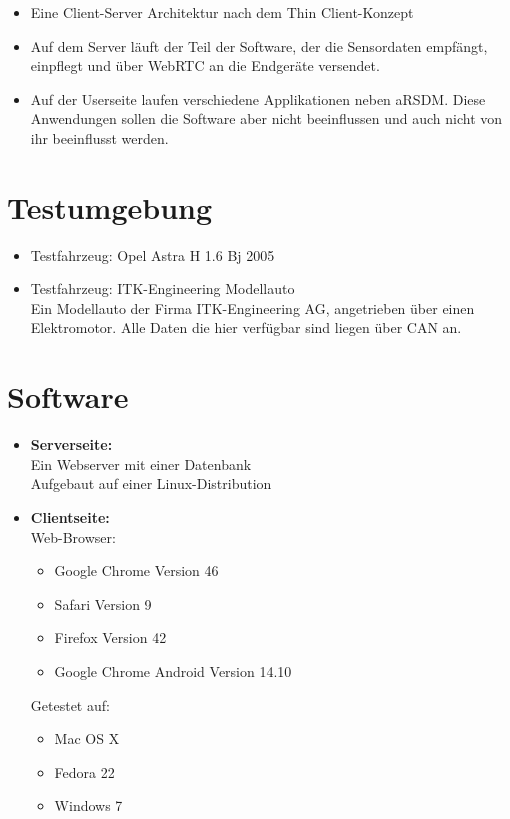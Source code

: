 \documentclass[pflichtenheft.tex]{subfiles}
\begin{document}
\begin{itemize}

\item
Eine Client-Server Architektur nach dem Thin Client-Konzept
\item
Auf dem Server läuft der Teil der Software, der die Sensordaten empfängt, einpflegt und über WebRTC an die Endgeräte versendet.
\item
Auf der Userseite laufen verschiedene Applikationen neben aRSDM. Diese Anwendungen sollen die Software aber nicht beeinflussen und auch nicht von ihr beeinflusst werden.
\end{itemize}

\section*{Testumgebung}
\begin{itemize}
\item
Testfahrzeug: Opel Astra H 1.6 Bj 2005 %
\item
Testfahrzeug: ITK-Engineering Modellauto \\
Ein Modellauto der Firma ITK-Engineering AG, angetrieben über einen Elektromotor. Alle Daten die hier verfügbar sind liegen über CAN an.
\end{itemize}


\section{Software}
\begin{itemize}
\item
\textbf{Serverseite:}\\
Ein Webserver mit einer Datenbank\\
Aufgebaut auf einer Linux-Distribution
\item
\textbf{Clientseite:}\\
Web-Browser:
\begin{itemize}
\item
Google Chrome Version 46
\item
Safari Version 9
\item
Firefox Version 42
\item
Google Chrome Android Version 14.10
\end{itemize}
Getestet auf:
\begin{itemize}
\item
Mac OS X
\item
Fedora 22
\item
Windows 7
\end{itemize}
\end{itemize}
\end{document}
